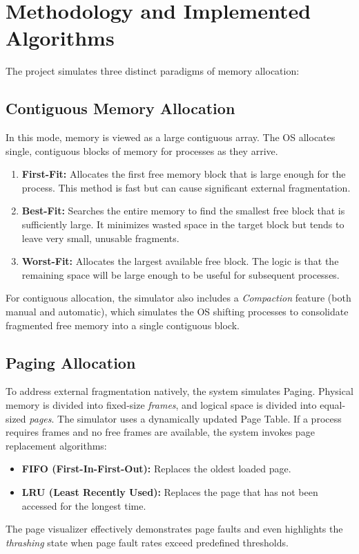 \documentclass[conference]{IEEEtran}
\begin{document}
\section{Methodology and Implemented Algorithms}
The project simulates three distinct paradigms of memory allocation:

\subsection{Contiguous Memory Allocation}
In this mode, memory is viewed as a large contiguous array. The OS allocates single, contiguous blocks of memory for processes as they arrive.
\begin{enumerate}
    \item \textbf{First-Fit:} Allocates the first free memory block that is large enough for the process. This method is fast but can cause significant external fragmentation.
    \item \textbf{Best-Fit:} Searches the entire memory to find the smallest free block that is sufficiently large. It minimizes wasted space in the target block but tends to leave very small, unusable fragments.
    \item \textbf{Worst-Fit:} Allocates the largest available free block. The logic is that the remaining space will be large enough to be useful for subsequent processes.
\end{enumerate}
For contiguous allocation, the simulator also includes a \textit{Compaction} feature (both manual and automatic), which simulates the OS shifting processes to consolidate fragmented free memory into a single contiguous block.

\subsection{Paging Allocation}
To address external fragmentation natively, the system simulates Paging. Physical memory is divided into fixed-size \textit{frames}, and logical space is divided into equal-sized \textit{pages}. The simulator uses a dynamically updated Page Table.
If a process requires frames and no free frames are available, the system invokes page replacement algorithms:
\begin{itemize}
    \item \textbf{FIFO (First-In-First-Out):} Replaces the oldest loaded page.
    \item \textbf{LRU (Least Recently Used):} Replaces the page that has not been accessed for the longest time.
\end{itemize}
The page visualizer effectively demonstrates page faults and even highlights the \textit{thrashing} state when page fault rates exceed predefined thresholds.
\end{document}

